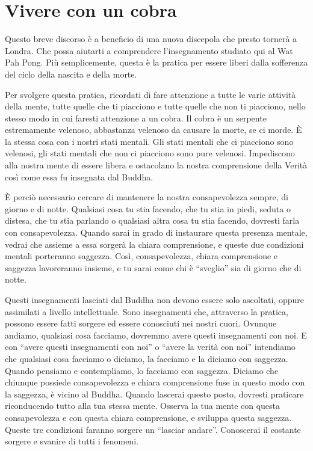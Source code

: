 \chapter{Vivere con un cobra}

Questo breve discorso è a beneficio di una nuova discepola che presto
tornerà a Londra. Che possa aiutarti a comprendere l'insegnamento
studiato qui al Wat Pah Pong. Più semplicemente, questa è la pratica per
essere liberi dalla sofferenza del ciclo della nascita e della morte.

Per svolgere questa pratica, ricordati di fare attenzione a tutte le
varie attività della mente, tutte quelle che ti piacciono e tutte quelle
che non ti piacciono, nello stesso modo in cui faresti attenzione a un
cobra. Il cobra è un serpente estremamente velenoso, abbastanza velenoso
da causare la morte, se ci morde. È la stessa cosa con i nostri stati
mentali. Gli stati mentali che ci piacciono sono velenosi, gli stati
mentali che non ci piacciono sono pure velenosi. Impediscono alla nostra
mente di essere libera e ostacolano la nostra comprensione della Verità
così come essa fu insegnata dal Buddha.

È perciò necessario cercare di mantenere la nostra consapevolezza
sempre, di giorno e di notte. Qualsiasi cosa tu stia facendo, che tu
stia in piedi, seduta o distesa, che tu stia parlando o qualsiasi altra
cosa tu stia facendo, dovresti farla con consapevolezza. Quando sarai in
grado di instaurare questa presenza mentale, vedrai che assieme a essa
sorgerà la chiara comprensione, e queste due condizioni mentali
porteranno saggezza. Così, consapevolezza, chiara comprensione e
saggezza lavoreranno insieme, e tu sarai come chi è ``sveglio'' sia di
giorno che di notte.

Questi insegnamenti lasciati dal Buddha non devono essere solo
ascoltati, oppure assimilati a livello intellettuale. Sono insegnamenti
che, attraverso la pratica, possono essere fatti sorgere ed essere
conosciuti nei nostri cuori. Ovunque andiamo, qualsiasi cosa facciamo,
dovremmo avere questi insegnamenti con noi. E con ``avere questi
insegnamenti con noi'' o ``avere la verità con noi'' intendiamo che
qualsiasi cosa facciamo o diciamo, la facciamo e la diciamo con
saggezza. Quando pensiamo e contempliamo, lo facciamo con saggezza.
Diciamo che chiunque possiede consapevolezza e chiara comprensione fuse
in questo modo con la saggezza, è vicino al Buddha. Quando lascerai
questo posto, dovresti praticare riconducendo tutto alla tua stessa
mente. Osserva la tua mente con questa consapevolezza e con questa
chiara comprensione, e sviluppa questa saggezza. Queste tre condizioni
faranno sorgere un ``lasciar andare''. Conoscerai il costante sorgere e
svanire di tutti i fenomeni.

